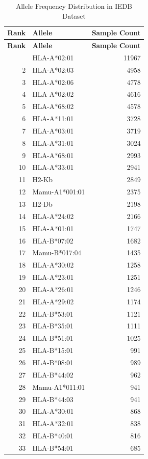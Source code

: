 \begin{longtable}{r l r}
\caption{Allele Frequency Distribution in IEDB Dataset}\\
\hline
\textbf{Rank} & \textbf{Allele} & \textbf{Sample Count} \\
\hline
\endfirsthead
\hline
\textbf{Rank} & \textbf{Allele} & \textbf{Sample Count} \\
\hline
\endhead
\hline
\endfoot
\hline
\endlastfoot
1 & HLA-A*02:01 & 11967 \\
2 & HLA-A*02:03 & 4958 \\
3 & HLA-A*02:06 & 4778 \\
4 & HLA-A*02:02 & 4616 \\
5 & HLA-A*68:02 & 4578 \\
6 & HLA-A*11:01 & 3728 \\
7 & HLA-A*03:01 & 3719 \\
8 & HLA-A*31:01 & 3024 \\
9 & HLA-A*68:01 & 2993 \\
10 & HLA-A*33:01 & 2941 \\
11 & H2-Kb & 2849 \\
12 & Mamu-A1*001:01 & 2375 \\
13 & H2-Db & 2198 \\
14 & HLA-A*24:02 & 2166 \\
15 & HLA-A*01:01 & 1747 \\
16 & HLA-B*07:02 & 1682 \\
17 & Mamu-B*017:04 & 1435 \\
18 & HLA-A*30:02 & 1258 \\
19 & HLA-A*23:01 & 1251 \\
20 & HLA-A*26:01 & 1246 \\
21 & HLA-A*29:02 & 1174 \\
22 & HLA-B*53:01 & 1121 \\
23 & HLA-B*35:01 & 1111 \\
24 & HLA-B*51:01 & 1025 \\
25 & HLA-B*15:01 & 991 \\
26 & HLA-B*08:01 & 989 \\
27 & HLA-B*44:02 & 962 \\
28 & Mamu-A1*011:01 & 941 \\
29 & HLA-B*44:03 & 941 \\
30 & HLA-A*30:01 & 868 \\
31 & HLA-A*32:01 & 838 \\
32 & HLA-B*40:01 & 816 \\
33 & HLA-B*54:01 & 685 \\

\end{longtable}
